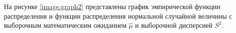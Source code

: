 \clearpage

На рисунке \ref{image:graph2} представлены график эмпирической функции распределения и функции распределения нормальной случайной величины с выборочным математическим ожиданием $\hat\mu$ и выборочной дисперсией $S^2$.
\begin{figure}[h]
\end{figure}
